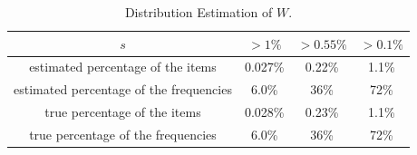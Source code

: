 \documentclass[conference]{IEEEtran}
\begin{document}
\begin{table}
	\caption{Distribution Estimation of $W$.}
	\centering
	\begin{tabular}{|c|c|c|c|}
    \hline
    $s$&$>1\%$&$>0.55\%$&$>0.1\%$\\
    \hline
    estimated percentage of the items&0.027\%&0.22\%&1.1\%\\
    \hline
    estimated percentage of the frequencies&6.0\%&36\%&72\%\\
    \hline
    true percentage of the items&0.028\%&0.23\%&1.1\%\\
    \hline
    true percentage of the frequencies&6.0\%&36\%&72\%\\
    \hline
	\end{tabular}
	\label{tab:distribution}
\end{table}
\end{document}
